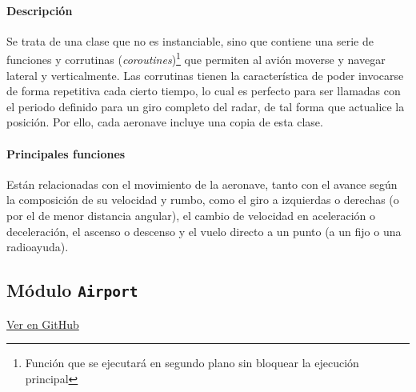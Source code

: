\paragraph{Descripción} \phantom{\newline}

Se trata de una clase que no es instanciable, sino que contiene una serie de funciones y corrutinas (\textit{coroutines})\footnote{Función que se ejecutará en segundo plano sin bloquear la ejecución principal} que permiten al avión moverse y navegar lateral y verticalmente. Las corrutinas tienen la característica de poder invocarse de forma repetitiva cada cierto tiempo, lo cual es perfecto para ser llamadas con el periodo definido para un giro completo del radar, de tal forma que actualice la posición. Por ello, cada aeronave incluye una copia de esta clase.




\paragraph{Principales funciones} \phantom{\newline}

Están relacionadas con el movimiento de la aeronave, tanto con el avance según la composición de su velocidad y rumbo, como el giro a izquierdas o derechas (o por el de menor distancia angular), el cambio de velocidad en aceleración o deceleración, el ascenso o descenso y el vuelo directo a un punto (a un fijo o una radioayuda).




\subsection{Módulo \texttt{Airport}}
\label{subsec:ClaseAirport}

\vspace{-0.85cm}
\begin{flushright}
\href{https://github.com/macgyver912/atc-simulator/blob/jaime/Assets/Scripts/airports/Airport.cs}{Ver en GitHub \faGithub}
\end{flushright}


